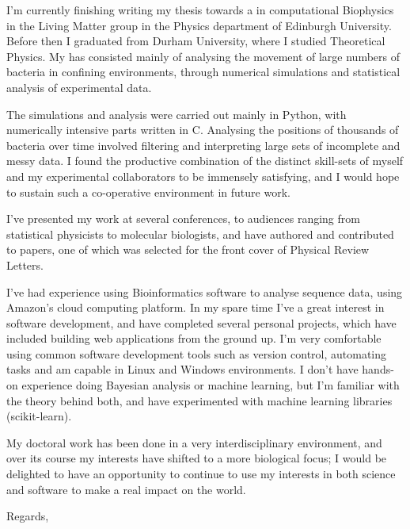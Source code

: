 \documentclass[10pt]{letter}
\begin{document}
    \begin{letter}{}

        I'm currently finishing writing my thesis towards a  in computational Biophysics in the Living Matter group in the Physics department of Edinburgh University. Before then I graduated from Durham University, where I studied Theoretical Physics. My  has consisted mainly of analysing the movement of large numbers of bacteria in confining environments, through numerical simulations and statistical analysis of experimental data.

        The simulations and analysis were carried out mainly in Python, with numerically intensive parts written in C. Analysing the positions of thousands of bacteria over time involved filtering and interpreting large sets of incomplete and messy data. I found the productive combination of the distinct skill-sets of myself and my experimental collaborators to be immensely satisfying, and I would hope to sustain such a co-operative environment in future work.

        I've presented my work at several conferences, to audiences ranging from statistical physicists to molecular biologists, and have authored and contributed to papers, one of which was selected for the front cover of Physical Review Letters.

        I've had experience using Bioinformatics software to analyse sequence data, using Amazon's cloud computing platform. In my spare time I've a great interest in software development, and have completed several personal projects, which have included building web applications from the ground up. I'm very comfortable using common software development tools such as version control, automating tasks and am capable in Linux and Windows environments. I don't have hands-on experience doing Bayesian analysis or machine learning, but I'm familiar with the theory behind both, and have experimented with machine learning libraries (scikit-learn).

        My doctoral work has been done in a very interdisciplinary environment, and over its course my interests have shifted to a more biological focus; I would be delighted to have an opportunity to continue to use my interests in both science and software to make a real impact on the world.

        \closing{Regards,}

    \end{letter}        
\end{document}
